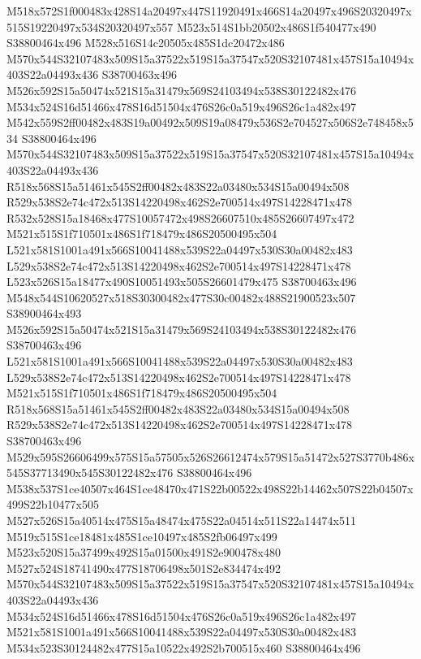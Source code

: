 \documentclass{article}
\begin{document}
\begin{multicols}{2}

M518x572S1f000483x428S14a20497x447S11920491x466S14a20497x496S20320497x515S19220497x534S20320497x557 M523x514S1bb20502x486S1f540477x490 S38800464x496 M528x516S14c20505x485S1dc20472x486 M570x544S32107483x509S15a37522x519S15a37547x520S32107481x457S15a10494x403S22a04493x436 S38700463x496 M526x592S15a50474x521S15a31479x569S24103494x538S30122482x476 M534x524S16d51466x478S16d51504x476S26c0a519x496S26c1a482x497 M542x559S2ff00482x483S19a00492x509S19a08479x536S2e704527x506S2e748458x534 S38800464x496 M570x544S32107483x509S15a37522x519S15a37547x520S32107481x457S15a10494x403S22a04493x436 R518x568S15a51461x545S2ff00482x483S22a03480x534S15a00494x508 R529x538S2e74c472x513S14220498x462S2e700514x497S14228471x478 R532x528S15a18468x477S10057472x498S26607510x485S26607497x472 M521x515S1f710501x486S1f718479x486S20500495x504 L521x581S1001a491x566S10041488x539S22a04497x530S30a00482x483 L529x538S2e74c472x513S14220498x462S2e700514x497S14228471x478 L523x526S15a18477x490S10051493x505S26601479x475 S38700463x496 M548x544S10620527x518S30300482x477S30c00482x488S21900523x507 S38900464x493 M526x592S15a50474x521S15a31479x569S24103494x538S30122482x476 S38700463x496 L521x581S1001a491x566S10041488x539S22a04497x530S30a00482x483 L529x538S2e74c472x513S14220498x462S2e700514x497S14228471x478 M521x515S1f710501x486S1f718479x486S20500495x504 R518x568S15a51461x545S2ff00482x483S22a03480x534S15a00494x508 R529x538S2e74c472x513S14220498x462S2e700514x497S14228471x478 S38700463x496 M529x595S26606499x575S15a57505x526S26612474x579S15a51472x527S3770b486x545S37713490x545S30122482x476 S38800464x496 M538x537S1ce40507x464S1ce48470x471S22b00522x498S22b14462x507S22b04507x499S22b10477x505 M527x526S15a40514x475S15a48474x475S22a04514x511S22a14474x511 M519x515S1ce18481x485S1ce10497x485S2fb06497x499 M523x520S15a37499x492S15a01500x491S2e900478x480 M527x524S18741490x477S18706498x501S2e834474x492 M570x544S32107483x509S15a37522x519S15a37547x520S32107481x457S15a10494x403S22a04493x436 M534x524S16d51466x478S16d51504x476S26c0a519x496S26c1a482x497 M521x581S1001a491x566S10041488x539S22a04497x530S30a00482x483 M534x523S30124482x477S15a10522x492S2b700515x460 S38800464x496



\end{multicols}
\end{document}
